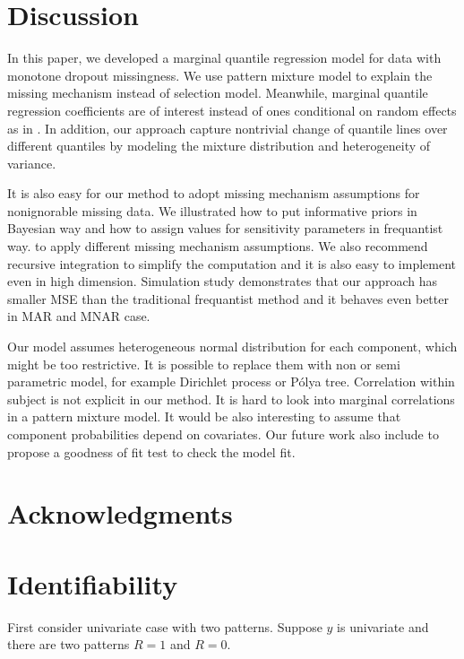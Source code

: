 \documentclass[12pt]{article}
\newcommand{\polya}{P\'{o}lya}
\begin{document}
\section{Discussion}
\label{sec:discussion}

In this paper, we developed a marginal quantile regression model for
data with monotone dropout missingness. We use pattern mixture model
to explain the missing mechanism instead of selection
model. Meanwhile, marginal quantile regression coefficients are of
interest instead of ones conditional on random effects as in
\citet{yuan2010}. In addition, our approach capture nontrivial change
of quantile lines over different quantiles by modeling the mixture
distribution and heterogeneity of variance.

It is also easy for our method to adopt missing mechanism assumptions
for nonignorable missing data. We illustrated how to put informative
priors in Bayesian way and how to assign values for sensitivity
parameters in frequantist way. to apply different missing mechanism
assumptions.  We also recommend recursive integration to simplify the
computation and it is also easy to implement even in high dimension.
Simulation study demonstrates that our approach has smaller MSE than
the traditional frequantist method and it behaves even better in MAR
and MNAR case.

Our model assumes heterogeneous normal distribution for each
component, which might be too restrictive. It is possible to replace
them with non or semi parametric model, for example Dirichlet process
or \polya{} tree. Correlation within subject is not explicit in our
method. It is hard to look into marginal correlations in a pattern
mixture model. It would be also interesting to assume that component
probabilities depend on covariates. Our future work also include to
propose a goodness of fit test to check the model fit.


\section{Acknowledgments}



% 




\appendix 
\section{Identifiability}
\label{sec:iden}
First consider univariate case with two patterns. Suppose $y$ is
univariate and there are two patterns $R = 1$ and $R = 0$.
\end{document}

